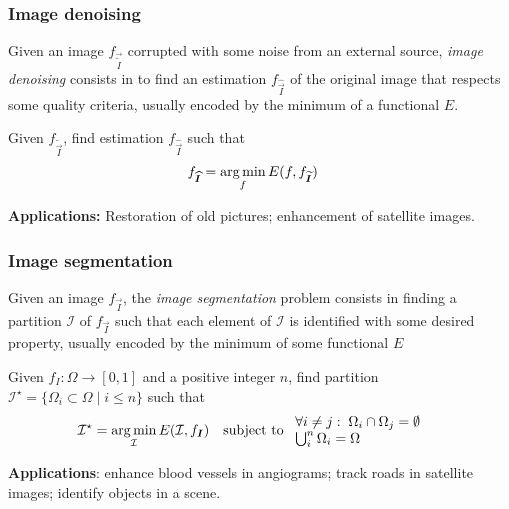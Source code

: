\subsubsection{Image denoising}
Given an image $f_{\vec{\widetilde{I}}}$ corrupted with some noise from an external source, \emph{image denoising} consists in to find an estimation $f_{\widehat{\vec{I}}}$ of the original image that respects some quality criteria, usually encoded by the minimum of a functional $E$. 

Given $f_{\widetilde{\vec{I}}}$, find estimation $f_{\widehat{\vec{I}}}$ such that
\begin{align*}
	f_{\widehat{\bm{I}}} &= \operatorname*{arg\,min}_f E(f,f_{\bm{\widetilde{I}}})
\end{align*}

\textbf{Applications:} Restoration of old pictures; enhancement of satellite images.

\subsubsection{Image segmentation}
Given an image $f_{\vec{I}}$, the \emph{image segmentation} problem consists in finding a partition $\mathcal{I}$ of $f_{\vec{I}}$ such that each element of $\mathcal{I}$ is identified with some desired property, usually encoded by the minimum of some functional $E$

%

Given $f_I:\Omega \rightarrow [0,1]$ and a positive integer $n$, find partition $\mathcal{I}^{\star} = \{ \Omega_i \subset \Omega \; | \; i \leq n \}$ such that
\begin{align*}
	\mathcal{I}^{\star} = \operatorname*{arg\,min}_{\mathcal{I}} E(\mathcal{I},f_{\bm{I}}) &\quad  \text{subject to } \begin{array}{l}
	\forall i\neq j:\; \Omega_i \cap \Omega_j = \emptyset\\ 
	\bigcup_i^{n} \Omega_i = \Omega
	\end{array}
\end{align*}

\textbf{Applications}: enhance blood vessels in angiograms; track roads in satellite images; identify objects in a scene. 



